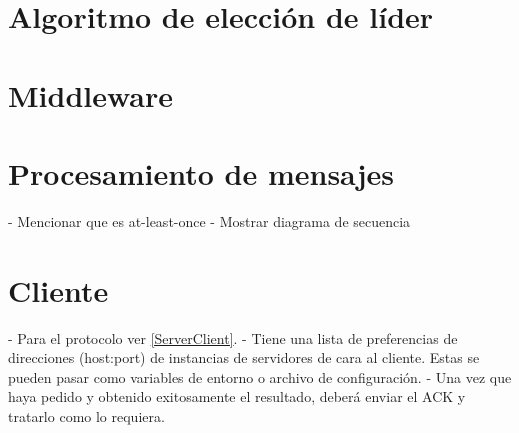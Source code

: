 \documentclass[titlepage,a4paper,oneside]{article}
\begin{document}
\section{Algoritmo de elección de líder}

\section{Middleware}

\section{Procesamiento de mensajes}
- Mencionar que es at-least-once
- Mostrar diagrama de secuencia

\section{Cliente}
- Para el protocolo ver \ref{ServerClient}.
- Tiene una lista de preferencias de direcciones (host:port) de instancias de servidores de cara al cliente. Estas se pueden pasar como variables de entorno o archivo de configuración.
- Una vez que haya pedido y obtenido exitosamente el resultado, deberá enviar el ACK y tratarlo como lo requiera.

\printbibliography
\end{document}
